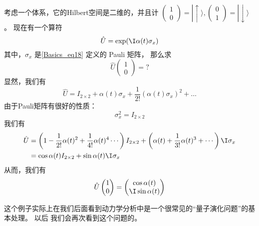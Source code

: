 \begin{exercise}{}
考虑一个体系，它的Hilbert空间是二维的，并且计 $\left(\begin{matrix}1 \\0\end{matrix}\right) = |\!\uparrow\rangle, \left(\begin{matrix}0 \\1\end{matrix}\right) = |\!\downarrow\rangle$。 现在有一个算符
\begin{equation}
\hat{U} = \exp(\I\alpha(t) \sigma_x)
\end{equation}
其中，$\sigma_x$ 是\autoref{Basics_eq18} 定义的 Pauli 矩阵， 那么求
\begin{equation}
\hat{U} \left(\begin{matrix}1 \\0\end{matrix}\right) = ? 
\end{equation}
显然，我们有
\begin{equation}
\hat U= I_{2\times2} + \alpha(t) \sigma_x + \frac{1}{2!}\left(\alpha(t) \sigma_x\right)^2 + \dots
\end{equation}
由于Pauli矩阵有很好的性质：
\begin{equation}
\sigma_x^2 = I_{2\times2}
\end{equation}
我们有
\begin{equation}
\begin{split}\hat U &= \left(1 - \frac{1}{2!}\alpha(t)^2 + \frac{1}{4!}\alpha(t)^4  \cdots\right)  I_{2\times2} + \left(\alpha(t) + \frac{1}{3!}\alpha(t)^3 + \cdots \right)\I \sigma_x\\
& = \cos\alpha(t) I_{2\times2} + \sin\alpha(t) \I\sigma_x 
\end{split}
\end{equation}
从而，我们有
\begin{equation}
\hat U \left(\begin{matrix}1 \\0\end{matrix}\right)  =  \left(\begin{matrix}\cos\alpha(t) \\ \I \sin\alpha(t)\end{matrix}\right)
\end{equation}

这个例子实际上在我们后面看到动力学分析中是一个很常见的``量子演化问题''的基本处理。 以后%
我们会再次看到这个问题的。
\end{exercise}

